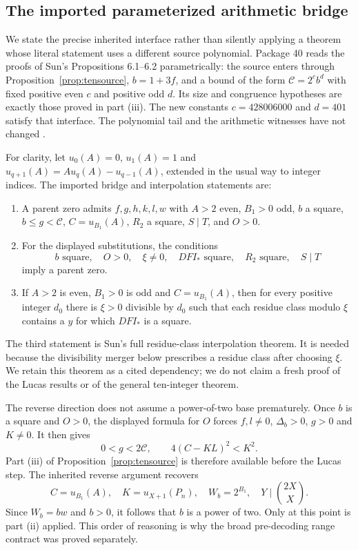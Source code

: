 \subsection{The imported parameterized arithmetic bridge}

We state the precise inherited interface rather than silently applying
a theorem whose literal statement uses a different source polynomial.
Package 40 reads the proofs of Sun's Propositions 6.1--6.2 parametrically:
the source enters through Proposition~\ref{prop:tensource},
$b=1+3f$, and a bound of the form $\mathcal C=2^c b^d$ with fixed
positive even $c$ and positive odd $d$. Its size and congruence
hypotheses are exactly those proved in part (iii). The new constants
$c=428006000$ and $d=401$ satisfy that interface. The polynomial
tail and the arithmetic witnesses have not changed
\cite{package40,sun2021,sun2026}.

For clarity, let $u_0(A)=0$, $u_1(A)=1$ and
$u_{q+1}(A)=Au_q(A)-u_{q-1}(A)$, extended in the usual way to
integer indices. The imported bridge and interpolation statements are:
\begin{enumerate}[leftmargin=*]
\item A parent zero admits $f,g,h,k,l,w$ with $A>2$ even,
 $B_1>0$ odd, $b$ a square, $b\le g<\mathcal C$,
 $C=u_{B_1}(A)$, $R_2$ a square, $S\mid T$, and $O>0$.
\item For the displayed substitutions, the conditions
 \[
 b\text{ square},\quad O>0,\quad \xi\ne0,\quad
 DFI_*\text{ square},\quad R_2\text{ square},\quad S\mid T
 \]
 imply a parent zero.
\item If $A>2$ is even, $B_1>0$ is odd and $C=u_{B_1}(A)$,
 then for every positive integer $d_0$ there is $\xi>0$ divisible
 by $d_0$ such that each residue class modulo $\xi$ contains a $y$
 for which $DFI_*$ is a square.
\end{enumerate}
The third statement is Sun's full residue-class interpolation theorem.
It is needed because the divisibility merger below prescribes a residue
class after choosing $\xi$. We retain this theorem as a cited dependency;
we do not claim a fresh proof of the Lucas results or of the general
ten-integer theorem.

The reverse direction does not assume a power-of-two base prematurely.
Once $b$ is a square and $O>0$, the displayed formula for $O$ forces
$f,l\ne0$, $\Delta_b>0$, $g>0$ and $K\ne0$. It then gives
\[
 0<g<2\mathcal C,\qquad 4(C-KL)^2<K^2.
\]
Part (iii) of Proposition~\ref{prop:tensource} is therefore available
before the Lucas step. The inherited reverse argument recovers
\[
 C=u_{B_1}(A),\quad K=u_{X+1}(P_n),\quad
 W_b=2^{B_1},\quad Y\mid\binom{2X}{X}.
\]
Since $W_b=bw$ and $b>0$, it follows that $b$ is a power of two.
Only at this point is part (ii) applied. This order of reasoning is
why the broad pre-decoding range contract was proved separately.

